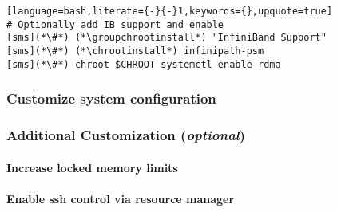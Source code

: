 \documentclass[letterpaper]{article}
\newcommand{\chrootinstall}{yum -y --installroot=\$CHROOT install}
\newcommand{\groupchrootinstall}{yum -y --installroot=\$CHROOT groupinstall}
\begin{document}
\begin{lstlisting}[language=bash,literate={-}{-}1,keywords={},upquote=true]
# Optionally add IB support and enable
[sms](*\#*) (*\groupchrootinstall*) "InfiniBand Support"
[sms](*\#*) (*\chrootinstall*) infinipath-psm
[sms](*\#*) chroot $CHROOT systemctl enable rdma
\end{lstlisting}

\subsubsection{Customize system configuration} \label{sec:master_customization}





\subsubsection{Additional Customization ({\em optional})} \label{sec:addl_customizations}


\paragraph{Increase locked memory limits}


\paragraph{Enable ssh control via resource manager} 

\end{document}
